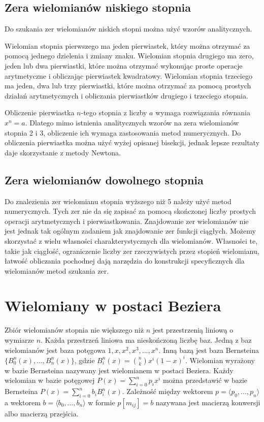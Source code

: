 \documentclass{article}
\begin{document}
\subsection{Zera wielomianów niskiego stopnia}


Do szukania zer wielomianów niskich stopni można użyć wzorów analitycznych. 

Wielomian stopnia pierwszego ma jeden pierwiastek, który można otrzymać za pomocą jednego dzielenia i zmiany znaku. Wielomian stopnia drugiego ma zero, jeden lub dwa pierwiastki, które można otrzymać wykonując proste operacje arytmetyczne i obliczając pierwiastek kwadratowy. Wielomian stopnia trzeciego ma jeden, dwa lub trzy pierwiastki, które można otrzymać za pomocą prostych działań arytmetycznych i obliczania pierwiastków drugiego i trzeciego stopnia.

Obliczenie pierwiastka $n$-tego stopnia z liczby $a$ wymaga rozwiązania równania $x^n = a$. Dlatego mimo istnienia analitycznych wzorów na zera wielomianów stopnia 2 i 3, obliczenie ich wymaga zastosowania metod numerycznych. Do obliczenia pierwiastka można użyć wyżej opisanej bisekcji, jednak lepsze rezultaty daje skorzystanie z metody Newtona.

\subsection{Zera wielomianów dowolnego stopnia}

Do znalezienia zer wielomianu stopnia wyższego niż 5 należy użyć metod numerycznych. Tych zer nie da się zapisać za pomocą skończonej liczby prostych operacji arytmetycznych i pierwiastkowania. Znajdowanie zer wielomianów nie jest jednak tak ogólnym zadaniem jak znajdowanie zer funkcji ciągłych. Możemy skorzystać z wielu własności charakterystycznych dla wielomianów. Własności te, takie jak ciągłość, ograniczenie liczby zer rzeczywistych przez stopień wielomianu, łatwość obliczania pochodnej dają narzędzia do konstrukcji specyficznych dla wielomianów metod szukania zer.

\section{Wielomiany w postaci Beziera}

Zbiór wielomianów stopnia nie większego niż $n$ jest przestrzenią liniową o wymiarze $n$. Każda przestrzeń liniowa ma nieskończoną liczbę baz. Jedną z baz wielomianów jest baza potęgowa ${1,x,x^2,x^3,...,x^n}$. Inną bazą jest baza Bernsteina $\{B^n_0(x),...,B^n_n(x)\}$, gdzie $B^n_i(x) = {n \choose k}x^i(1-x)^i$. Wielomian wyrażony w bazie Bernsteina nazywany jest wielomianem w postaci Beziera. Każdy wielomian w bazie potęgowej $P(x) = \sum^n_{i=0}p_i x^i$ można przedstawić w bazie Bernsteina $P(x) = \sum^n_{i=0}b_i B^n_i(x)$. Zależność między wektorem $p = \langle p_0,...,p_n \rangle$ a wektorem $b = \langle b_0, ..., b_n\rangle$ w formie $p [ m_{ij} ] = b$ nazywana jest macierzą konwersji albo macierzą przejścia.
\end{document}
